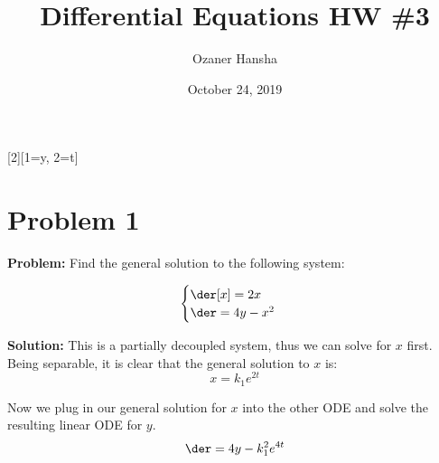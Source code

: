 \documentclass{article}
\begin{document}
\title{Differential Equations HW \#3}
\author{Ozaner Hansha}
\date{October 24, 2019}
\maketitle

[2][1=y, 2=t]{}
\newcommand*\eval[3]{\left[#1\right]_{#2}^{#3}}

\section*{Problem 1}
\noindent\textbf{Problem:} Find the general solution to the following system:

\[\begin{cases}
    \der[x]=2x \\
    \der=4y-x^2
\end{cases}\]
\bigskip

\noindent\textbf{Solution:} This is a partially decoupled system, thus we can solve for $x$ first. Being separable, it is clear that the general solution to $x$ is:
\begin{equation*}
    x=k_1e^{2t}
\end{equation*}



Now we plug in our general solution for $x$ into the other ODE and solve the resulting linear ODE for $y$.
\begin{equation*}
    \der=4y-k_1^2e^{4t}
\end{equation*}
\end{document}
